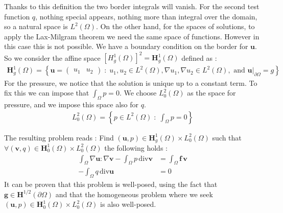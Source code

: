 \documentclass{article}
\begin{document}
Thanks to this definition the two border integrals will vanish. For the second
test function $q$, nothing special appears, nothing more than integral
over the domain, so a natural space is $L^2(\Omega)$. On the other hand, for
the spaces of solutions, to apply the Lax-Milgram theorem we need the same
space of functions. However in this case this is not possible. We have a
boundary condition on the border for $\mathbf{u}$. So we consider the affine
space $[H^1_g(\Omega)]^2=\mathbf{H}^1_g(\Omega)$ defined as :
\begin{align*}
    \mathbf{H}^1_g(\Omega)=\left\{\mathbf{u}=\begin{pmatrix} u_1 & u_2 \end{pmatrix} \;:\; u_1, u_2 \in L^2(\Omega), \nabla u_1, \nabla u_2 \in L^2(\Omega), \textrm{ and } \mathbf{u}|_{\partial\Omega}=g \right\}
\end{align*}
For the pressure, we notice that the solution is unique up to a constant term.
To fix this we can impose that $\int_\Omega p = 0$. We choose $L_0^2(\Omega)$ as
the space for pressure, and we impose this space also for $q$.
\begin{align*}
    L^2_0(\Omega)=\left\{p\in L^2(\Omega)\; : \; \int_\Omega p =0\right\}
\end{align*}

The resulting problem reads :
Find $(\mathbf{u},p)\in \mathbf{H}^1_g(\Omega)\times L^2_0(\Omega)$ such that
$\forall (\mathbf{v},q)\in \mathbf{H}^1_0(\Omega)\times L^2_0(\Omega)$ the
following holds :
\begin{align}
	\int_{\Omega} \nabla \mathbf{u} \mathbf{:} \nabla \mathbf{v}-\int_{\Omega} p\,
	\mathrm{div}\mathbf{v} &= \int_{\Omega}\mathbf{f}\, \mathbf{v} \\
	-\int_{\Omega} q\, \mathrm{div}\mathbf{u} &= 0 \nonumber
\end{align}
It can be proven that this problem is well-posed, using the fact that $\mathbf{g} \in \mathbf{H}^{1/2}(\partial\Omega)$ and that the homogeneous problem where we seek $(\mathbf{u},p)\in\mathbf{H}^1_0(\Omega)\times L^2_0(\Omega)$ is also well-posed.
\end{document}
